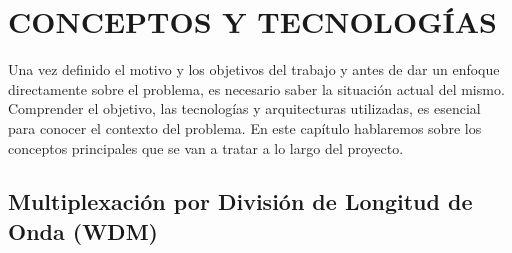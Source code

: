 \chapter{CONCEPTOS Y TECNOLOGÍAS}
\label{chap2:conceptos}

Una vez definido el motivo y los objetivos del trabajo y antes de dar un enfoque
directamente sobre el problema, es necesario saber la situación actual del mismo.
Comprender el objetivo, las tecnologías y arquitecturas utilizadas, es esencial para conocer el contexto del problema. En este capítulo hablaremos sobre los conceptos principales que se van a tratar a lo largo del proyecto.



\section{Multiplexación por División de Longitud de Onda (WDM)}


